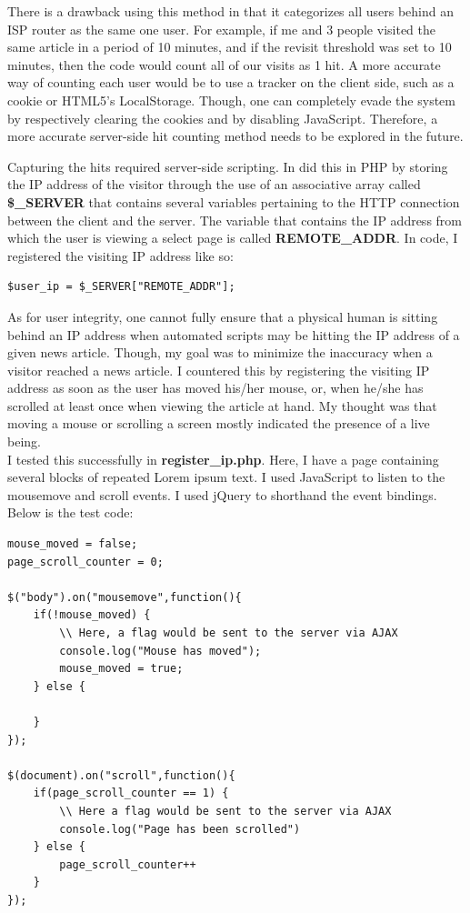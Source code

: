 \documentclass[12pt]{article}
\begin{document}
\noindent There is a drawback using this method in that it categorizes all users behind an ISP router as the same one user. For example, if me and 3 people visited the same article in a period of 10 minutes, and if the revisit threshold was set to 10 minutes, then the code would count all of our visits as 1 hit. A more accurate way of counting each user would be to use a tracker on the client side, such as a cookie or HTML5's LocalStorage. Though, one can completely evade the system by respectively clearing the cookies and by disabling JavaScript. Therefore, a more accurate server-side hit counting method needs to be explored in the future.  

Capturing the hits required server-side scripting. In did this in PHP by storing the IP address of the visitor through the use of an associative array called \textbf{\$\_SERVER} that contains several variables pertaining to the HTTP connection between the client and the server. The variable that contains the IP address from which the user is viewing a select page is called \textbf{REMOTE\_ADDR}. In code, I registered the visiting IP address like so:
\begin{lstlisting}
$user_ip = $_SERVER["REMOTE_ADDR"];
\end{lstlisting}


As for user integrity, one cannot fully ensure that a physical human is sitting behind an IP address when automated scripts may be hitting the IP address of a given news article. Though, my goal was to minimize the inaccuracy when a visitor reached a news article. I countered this by registering the visiting IP address as soon as the user has moved his/her mouse, or, when he/she has scrolled at least once when viewing the article at hand. My thought was that moving a mouse or scrolling a screen mostly indicated the presence of a live being. \\ 
I tested this successfully in \textbf{register\_ip.php}. Here, I have a page containing several blocks of repeated Lorem ipsum text. I used JavaScript to listen to the mousemove and scroll events. I used jQuery to shorthand the event bindings. Below is the test code:
\begin{lstlisting}[basicstyle=\scriptsize]
mouse_moved = false;
page_scroll_counter = 0;

$("body").on("mousemove",function(){
	if(!mouse_moved) {
		\\ Here, a flag would be sent to the server via AJAX
		console.log("Mouse has moved");
		mouse_moved = true;
	} else {
		
	}
});

$(document).on("scroll",function(){
	if(page_scroll_counter == 1) {
		\\ Here a flag would be sent to the server via AJAX
		console.log("Page has been scrolled")
	} else {
		page_scroll_counter++
	}
});
\end{lstlisting}        
\end{document}
